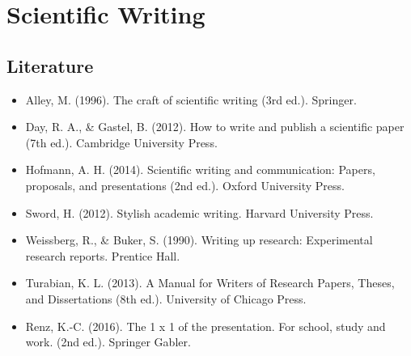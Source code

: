     \chapter{Scientific Writing}

    \section{Literature}
    \begin{itemize}
        \item Alley, M. (1996). The craft of scientific writing (3rd ed.). Springer.
        \item Day, R. A., \& Gastel, B. (2012). How to write and publish a scientific paper (7th ed.). Cambridge University Press.
        \item Hofmann, A. H. (2014). Scientific writing and communication: Papers, proposals, and presentations (2nd ed.). Oxford University Press.
        \item Sword, H. (2012). Stylish academic writing. Harvard University Press.
        \item Weissberg, R., \& Buker, S. (1990). Writing up research: Experimental research reports. Prentice Hall.
        \item Turabian, K. L. (2013). A Manual for Writers of Research Papers, Theses, and Dissertations (8th ed.). University of Chicago Press.
        \item Renz, K.-C. (2016). The 1 x 1 of the presentation. For school, study and work. (2nd ed.). Springer Gabler.
    \end{itemize}

